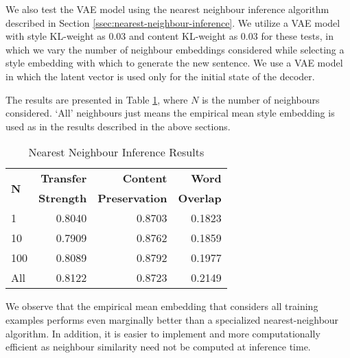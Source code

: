 We also test the VAE model using the nearest neighbour inference algorithm described in Section \ref{ssec:nearest-neighbour-inference}. We utilize a VAE model with style KL-weight as $0.03$ and content KL-weight as $0.03$ for these tests, in which we vary the number of neighbour embeddings considered while selecting a style embedding with which to generate the new sentence. We use a VAE model in which the latent vector is used only for the initial state of the decoder.

The results are presented in Table \ref{tab:nearest-neighbour-inference-results}, where $N$ is the number of neighbours considered. `All' neighbours just means the empirical mean style embedding is used as in the results described in the above sections.

\begin{table}[ht]
	\centering
	\begin{tabular}{| l | r | r | r |}
		\hline
		\multirow{2}{*}{
		\textbf{N}} & \textbf{Transfer} & \textbf{Content}      & \textbf{Word}    \\
		            & \textbf{Strength} & \textbf{Preservation} & \textbf{Overlap} \\
		\hline
		\hline
		1           & 0.8040            & 0.8703                & 0.1823           \\
		\hline
		10          & 0.7909            & 0.8762                & 0.1859           \\
		\hline
		100         & 0.8089            & 0.8792                & 0.1977           \\
		\hline
		All         & 0.8122            & 0.8723                & 0.2149           \\
		\hline
	\end{tabular}
	\caption{Nearest Neighbour Inference Results}
	\label{tab:nearest-neighbour-inference-results}
\end{table}

We observe that the empirical mean embedding that considers all training examples performs even marginally better than a specialized nearest-neighbour algorithm. In addition, it is easier to implement and more computationally efficient as neighbour similarity need not be computed at inference time.

